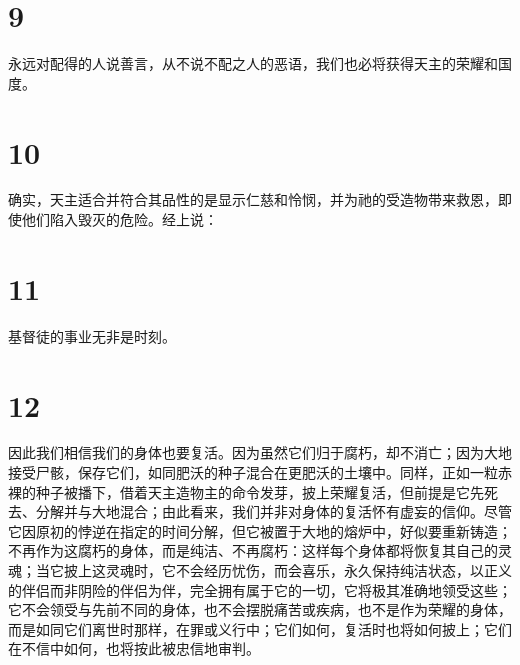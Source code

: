 \section{9}

永远对配得的人说善言，从不说不配之人的恶语，我们也必将获得天主的荣耀和国度。\par


\section{10}

确实，天主适合并符合其品性的是显示仁慈和怜悯，并为祂的受造物带来救恩，即使他们陷入毁灭的危险。经上说：\par


\section{11}

基督徒的事业无非是时刻。\par


\section{12}

因此我们相信我们的身体也要复活。因为虽然它们归于腐朽，却不消亡；因为大地接受尸骸，保存它们，如同肥沃的种子混合在更肥沃的土壤中。同样，正如一粒赤裸的种子被播下，借着天主造物主的命令发芽，披上荣耀复活，但前提是它先死去、分解并与大地混合；由此看来，我们并非对身体的复活怀有虚妄的信仰。尽管它因原初的悖逆在指定的时间分解，但它被置于大地的熔炉中，好似要重新铸造；不再作为这腐朽的身体，而是纯洁、不再腐朽：这样每个身体都将恢复其自己的灵魂；当它披上这灵魂时，它不会经历忧伤，而会喜乐，永久保持纯洁状态，以正义的伴侣而非阴险的伴侣为伴，完全拥有属于它的一切，它将极其准确地领受这些；它不会领受与先前不同的身体，也不会摆脱痛苦或疾病，也不是作为荣耀的身体，而是如同它们离世时那样，在罪或义行中；它们如何，复活时也将如何披上；它们在不信中如何，也将按此被忠信地审判。\par


